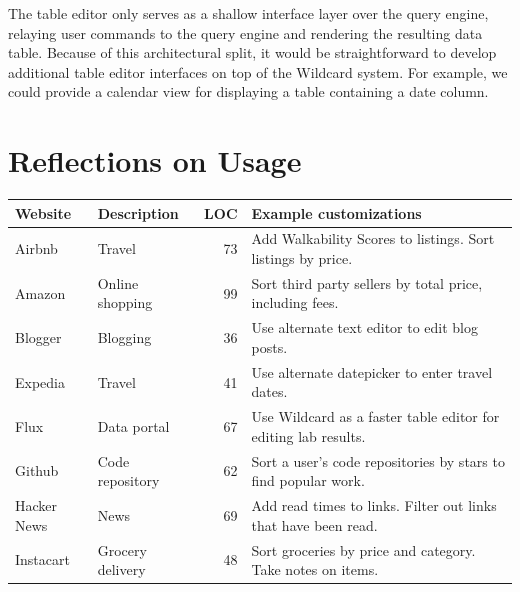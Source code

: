 \documentclass[sigplan,screen,10pt,anonymous,review]{acmart}
\begin{document}
The table editor only serves as a shallow interface layer over the query
engine, relaying user commands to the query engine and rendering the
resulting data table. Because of this architectural split, it would be
straightforward to develop additional table editor interfaces on top of
the Wildcard system. For example, we could provide a calendar view for
displaying a table containing a date column.

\hypertarget{sec:reflections}{%
\section{Reflections on Usage}\label{sec:reflections}}

\begin{table}[]
\begin{tabular}{llrl}
\hline
\textbf{Website} & \textbf{Description} & \textbf{LOC} & \textbf{Example customizations}                                                              \\ \hline
Airbnb           & Travel               & 73                                       & Add Walkability Scores to listings. Sort listings by price.                           \\
Amazon           & Online shopping      & 99                                       & Sort third party sellers by total price, including fees.                                \\
Blogger          & Blogging             & 36                                       & Use alternate text editor to edit blog posts.                                                 \\
Expedia          & Travel               & 41                                       & Use alternate datepicker to enter travel dates.                                               \\
Flux             & Data portal          & 67                                       & Use Wildcard as a faster table editor for editing lab results.                                \\
Github           & Code repository      & 62                                       & Sort a user's code repositories by stars to find popular work.                                \\
Hacker News      & News                 & 69                                       & Add read times to links. Filter out links that have been read. \\
Instacart        & Grocery delivery     & 48                                       & Sort groceries by price and category. Take notes on items.                                   \\

\end{tabular}
\end{table}
\end{document}
